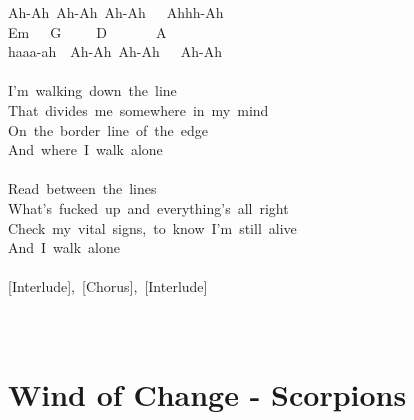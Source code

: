 \documentclass[]{book}
\let\stdsection\section
\renewcommand\section{\clearpage\stdsection}
\begin{document}
Ah-Ah~Ah-Ah~Ah-Ah~~~Ahhh-Ah\\
\hspace*{0.333em}\hspace*{0.333em}\hspace*{0.333em}\hspace*{0.333em}\hspace*{0.333em}Em~~~G~~~~~D~~~~~~~A\\
haaa-ah~~Ah-Ah~Ah-Ah~~~Ah-Ah\\
~\\
I'm~walking~down~the~line\\
That~divides~me~somewhere~in~my~mind\\
On~the~border~line~of~the~edge\\
And~where~I~walk~alone\\
~\\
Read~between~the~lines\\
What's~fucked~up~and~everything's~all~right\\
Check~my~vital~signs,~to~know~I'm~still~alive\\
And~I~walk~alone\\
~\\
{[}Interlude{]},~{[}Chorus{]},~{[}Interlude{]}\\
~\\
~\\

\hypertarget{wind-of-change---scorpions}{%
\section{Wind of Change - Scorpions}\label{wind-of-change---scorpions}}
\end{document}
